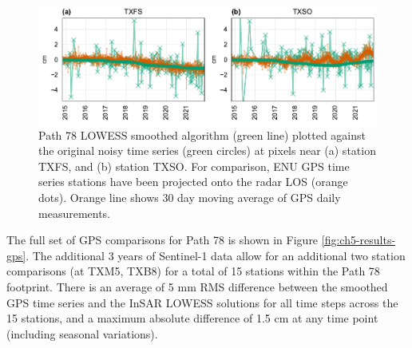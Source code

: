 \begin{figure}
	\centering
	\includegraphics[width=.99\textwidth]{figures/chapter5-lowess/gps_path78_2plots.pdf}
	\caption[Example results for Path 78 LOWESS smoothing]{
		Path 78 LOWESS smoothed algorithm (green line) plotted against the original noisy time series (green circles) at pixels near (a) station TXFS, and (b) station TXSO.
		For comparison, ENU GPS time series stations have been projected onto the radar LOS (orange dots). Orange line shows 30 day moving average of GPS daily measurements.
	}
	\label{fig:ch5-results-gps-example}
\end{figure}


The full set of GPS comparisons for Path 78 is shown in Figure \ref{fig:ch5-results-gps}. 
The additional 3 years of Sentinel-1 data allow for an additional two station comparisons (at TXM5, TXB8) for a total of 15 stations within the Path 78 footprint.
There is an average of 5 mm RMS difference between the smoothed GPS time series and the InSAR LOWESS solutions for all time steps across the 15 stations, and a maximum absolute difference of 1.5 cm at any time point (including seasonal variations).



